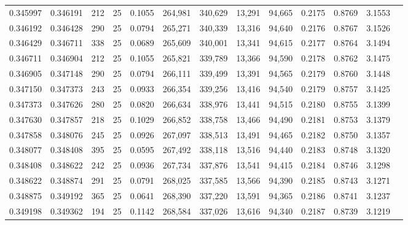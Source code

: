 \begin{tabular}{rrrrrrrrrrrrr}
0.345997 & 0.346191 &   212 &  25 &                                     0.1055 & 264,981 & 340,629 &  13,291 &  94,665 & 0.2175 & 0.8769 & 3.1553 \\
0.346192 & 0.346428 &   290 &  25 &                                     0.0794 & 265,271 & 340,339 &  13,316 &  94,640 & 0.2176 & 0.8767 & 3.1526 \\
0.346429 & 0.346711 &   338 &  25 &                                     0.0689 & 265,609 & 340,001 &  13,341 &  94,615 & 0.2177 & 0.8764 & 3.1494 \\
0.346711 & 0.346904 &   212 &  25 &                                     0.1055 & 265,821 & 339,789 &  13,366 &  94,590 & 0.2178 & 0.8762 & 3.1475 \\
0.346905 & 0.347148 &   290 &  25 &                                     0.0794 & 266,111 & 339,499 &  13,391 &  94,565 & 0.2179 & 0.8760 & 3.1448 \\
0.347150 & 0.347373 &   243 &  25 &                                     0.0933 & 266,354 & 339,256 &  13,416 &  94,540 & 0.2179 & 0.8757 & 3.1425 \\
0.347373 & 0.347626 &   280 &  25 &                                     0.0820 & 266,634 & 338,976 &  13,441 &  94,515 & 0.2180 & 0.8755 & 3.1399 \\
0.347630 & 0.347857 &   218 &  25 &                                     0.1029 & 266,852 & 338,758 &  13,466 &  94,490 & 0.2181 & 0.8753 & 3.1379 \\
0.347858 & 0.348076 &   245 &  25 &                                     0.0926 & 267,097 & 338,513 &  13,491 &  94,465 & 0.2182 & 0.8750 & 3.1357 \\
0.348077 & 0.348408 &   395 &  25 &                                     0.0595 & 267,492 & 338,118 &  13,516 &  94,440 & 0.2183 & 0.8748 & 3.1320 \\
0.348408 & 0.348622 &   242 &  25 &                                     0.0936 & 267,734 & 337,876 &  13,541 &  94,415 & 0.2184 & 0.8746 & 3.1298 \\
0.348622 & 0.348874 &   291 &  25 &                                     0.0791 & 268,025 & 337,585 &  13,566 &  94,390 & 0.2185 & 0.8743 & 3.1271 \\
0.348875 & 0.349192 &   365 &  25 &                                     0.0641 & 268,390 & 337,220 &  13,591 &  94,365 & 0.2186 & 0.8741 & 3.1237 \\
0.349198 & 0.349362 &   194 &  25 &                                     0.1142 & 268,584 & 337,026 &  13,616 &  94,340 & 0.2187 & 0.8739 & 3.1219 \\

\end{tabular}
